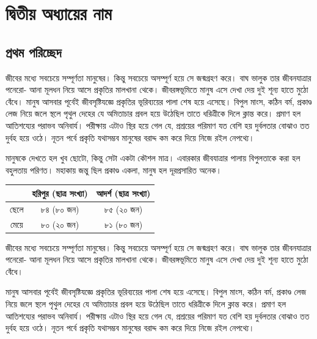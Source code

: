 \normalsize
{}
\chapter{দ্বিতীয় অধ্যায়ের নাম}

\section{প্রথম পরিচ্ছেদ}

জীবের মধ্যে সবচেয়ে সম্পূর্ণতা মানুষের। কিন্তু সবচেয়ে অসম্পূর্ণ হয়ে সে জন্মগ্রহণ করে। বাঘ ভালুক তার জীবনযাত্রার পনেরো- আনা মূলধন নিয়ে আসে প্রকৃতির মালখানা থেকে। জীবরঙ্গভূমিতে মানুষ এসে দেখা দেয় দুই শূন্য হাতে মুঠো বেঁধে।
মানুষ আসবার পূর্বেই জীবসৃষ্টিযজ্ঞে প্রকৃতির ভূরিব্যয়ের পালা শেষ হয়ে এসেছে। বিপুল মাংস, কঠিন বর্ম, প্রকাণ্ড লেজ নিয়ে জলে স্থলে পৃথুল দেহের যে অমিতাচার প্রবল হয়ে উঠেছিল তাতে ধরিত্রীকে দিলে ক্লান্ত করে। প্রমাণ হল আতিশয্যের পরাভব অনিবার্য। পরীক্ষায় এটাও স্থির হয়ে গেল যে, প্রশ্রয়ের পরিমাণ যত বেশি হয় দুর্বলতার বোঝাও তত দুর্বহ হয়ে ওঠে। নূতন পর্বে প্রকৃতি যথাসম্ভব মানুষের বরাদ্দ কম করে দিয়ে নিজে রইল নেপথ্যে।

মানুষকে দেখতে হল খুব ছোটো, কিন্তু সেটা একটা কৌশল মাত্র। এবারকার জীবযাত্রার পালায় বিপুলতাকে করা হল বহুলতায় পরিণত। মহাকায় জন্তু ছিল প্রকাণ্ড একলা, মানুষ হল দূরপ্রসারিত অনেক।
\begin{table}[ht]
	\centering
	\begin{tabular}{|c|c|c|}
		\hline
		&	হরিপুর (ছাত্র সংখ্যা)	&	আদর্শ (ছাত্র সংখ্যা) \\
		\hline
		ছেলে	&	৮৪  (৮০ জন) 		&	৮৫ (২০ জন) \\
		\hline
		মেয়ে	&	৮০  (২০ জন) 		&	৮১  (৮০ জন)\\
		\hline
	\end{tabular}
\end{table}

জীবের মধ্যে সবচেয়ে সম্পূর্ণতা মানুষের। কিন্তু সবচেয়ে অসম্পূর্ণ হয়ে সে জন্মগ্রহণ করে। বাঘ ভালুক তার জীবনযাত্রার পনেরো- আনা মূলধন নিয়ে আসে প্রকৃতির মালখানা থেকে। জীবরঙ্গভূমিতে মানুষ এসে দেখা দেয় দুই শূন্য হাতে মুঠো বেঁধে।

মানুষ আসবার পূর্বেই জীবসৃষ্টিযজ্ঞে প্রকৃতির ভূরিব্যয়ের পালা শেষ হয়ে এসেছে। বিপুল মাংস, কঠিন বর্ম, প্রকাণ্ড লেজ নিয়ে জলে স্থলে পৃথুল দেহের যে অমিতাচার প্রবল হয়ে উঠেছিল তাতে ধরিত্রীকে দিলে ক্লান্ত করে। প্রমাণ হল আতিশয্যের পরাভব অনিবার্য। পরীক্ষায় এটাও স্থির হয়ে গেল যে, প্রশ্রয়ের পরিমাণ যত বেশি হয় দুর্বলতার বোঝাও তত দুর্বহ হয়ে ওঠে। নূতন পর্বে প্রকৃতি যথাসম্ভব মানুষের বরাদ্দ কম করে দিয়ে নিজে রইল নেপথ্যে।

